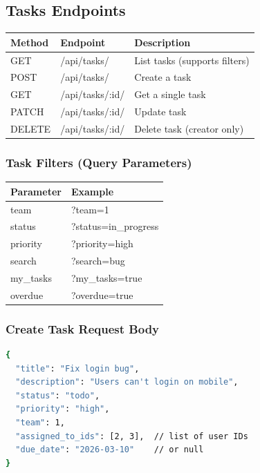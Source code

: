 \documentclass[12pt,a4paper]{article}
\begin{document}
\subsection{Tasks Endpoints}
\begin{center}
\begin{tabularx}{\textwidth}{llX}
\toprule
\textbf{Method} & \textbf{Endpoint} & \textbf{Description} \\
\midrule
GET & /api/tasks/ & List tasks (supports filters) \\
POST & /api/tasks/ & Create a task \\
GET & /api/tasks/:id/ & Get a single task \\
PATCH & /api/tasks/:id/ & Update task \\
DELETE & /api/tasks/:id/ & Delete task (creator only) \\
\bottomrule
\end{tabularx}
\end{center}

\subsubsection{Task Filters (Query Parameters)}
\begin{center}
\begin{tabular}{ll}
\toprule
\textbf{Parameter} & \textbf{Example} \\
\midrule
team & ?team=1 \\
status & ?status=in\_progress \\
priority & ?priority=high \\
search & ?search=bug \\
my\_tasks & ?my\_tasks=true \\
overdue & ?overdue=true \\
\bottomrule
\end{tabular}
\end{center}

\subsubsection{Create Task Request Body}
\begin{lstlisting}[language=bash]
{
  "title": "Fix login bug",
  "description": "Users can't login on mobile",
  "status": "todo",
  "priority": "high",
  "team": 1,
  "assigned_to_ids": [2, 3],  // list of user IDs
  "due_date": "2026-03-10"    // or null
}
\end{lstlisting}
\end{document}
